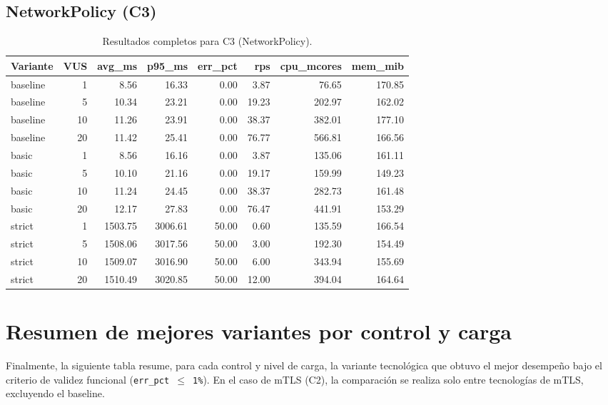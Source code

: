 \subsection{NetworkPolicy (C3)}
\begin{table}[htbp]
\centering
\small
\caption{Resultados completos para C3 (NetworkPolicy).}
\label{tab:s2-c3}
\begin{tabular}{lrrrrrrr}
\toprule
Variante & VUS & avg\_ms & p95\_ms & err\_pct & rps & cpu\_mcores & mem\_mib \\
\midrule
baseline & 1  & 8.56    & 16.33   & 0.00  & 3.87  & 76.65  & 170.85 \\
baseline & 5  & 10.34   & 23.21   & 0.00  & 19.23 & 202.97 & 162.02 \\
baseline & 10 & 11.26   & 23.91   & 0.00  & 38.37 & 382.01 & 177.10 \\
baseline & 20 & 11.42   & 25.41   & 0.00  & 76.77 & 566.81 & 166.56 \\
basic    & 1  & 8.56    & 16.16   & 0.00  & 3.87  & 135.06 & 161.11 \\
basic    & 5  & 10.10   & 21.16   & 0.00  & 19.17 & 159.99 & 149.23 \\
basic    & 10 & 11.24   & 24.45   & 0.00  & 38.37 & 282.73 & 161.48 \\
basic    & 20 & 12.17   & 27.83   & 0.00  & 76.47 & 441.91 & 153.29 \\
strict   & 1  & 1503.75 & 3006.61 & 50.00 & 0.60  & 135.59 & 166.54 \\
strict   & 5  & 1508.06 & 3017.56 & 50.00 & 3.00  & 192.30 & 154.49 \\
strict   & 10 & 1509.07 & 3016.90 & 50.00 & 6.00  & 343.94 & 155.69 \\
strict   & 20 & 1510.49 & 3020.85 & 50.00 & 12.00 & 394.04 & 164.64 \\
\bottomrule
\end{tabular}
\end{table}

\section{Resumen de mejores variantes por control y carga}

Finalmente, la siguiente tabla resume, para cada control y nivel de carga, la variante tecnológica que obtuvo el mejor desempeño bajo el criterio de validez funcional (\texttt{err\_pct $\leq$ 1\%}). En el caso de mTLS (C2), la comparación se realiza solo entre tecnologías de mTLS, excluyendo el baseline.

